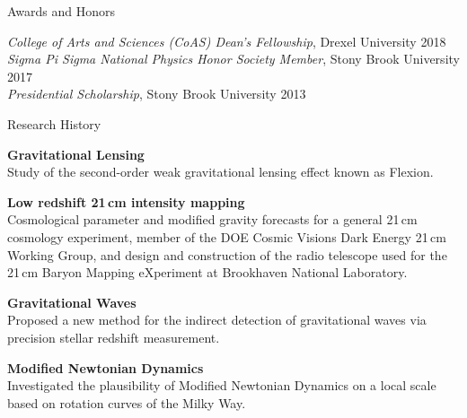 \documentclass{resume} %
\begin{document}

\begin{rSection}{Awards and Honors}

\textit{College of Arts and Sciences (CoAS) Dean's Fellowship}, Drexel University \hfill {2018}\\
\textit{Sigma Pi Sigma National Physics Honor Society Member}, Stony Brook University \hfill{2017}\\
\textit{Presidential Scholarship}, Stony Brook University \hfill {2013}\\

\end{rSection}


\begin{rSection}{Research History}

\begin{description}[leftmargin=8em, style=nextline]

\item[\textnormal{2018 -- Present}] \textbf{Gravitational Lensing}\\
Study of the second-order weak gravitational lensing effect known as Flexion. 
\item[\textnormal{2015 -- Present}] \textbf{Low redshift 21$\,$cm intensity mapping}\\
 Cosmological parameter and modified gravity forecasts for a general 21$\,$cm cosmology 
 experiment, member of the DOE Cosmic Visions Dark Energy 21$\,$cm Working Group, and design and construction
 of the radio telescope used for the 21$\,$cm Baryon Mapping eXperiment at Brookhaven National
 Laboratory.
\item[\textnormal{2013}] \textbf{Gravitational Waves}\\
 Proposed a new method for the indirect detection of gravitational waves via precision 
 stellar redshift measurement.
\item[\textnormal{2012}] \textbf{Modified Newtonian Dynamics}\\
 Investigated the plausibility of Modified Newtonian Dynamics on a local scale based on
 rotation curves of the Milky Way.

\end{description}

\end{rSection}
\end{document}

